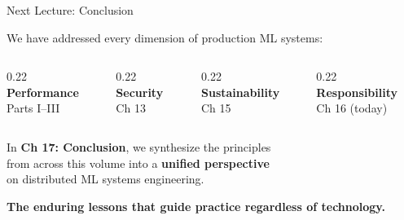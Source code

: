 \documentclass[aspectratio=169, 12pt]{beamer}
\begin{document}
\begin{frame}{Next Lecture: Conclusion}

\centering
\vspace{0.5cm}

{\large We have addressed every dimension of production ML systems:}

\vspace{0.4cm}
\begin{columns}[c]
  \begin{column}{0.22\textwidth}\centering\small
    \textcolor{computestroke}{\textbf{Performance}}\\[0.1cm]
    {\footnotesize Parts I--III}
  \end{column}
  \begin{column}{0.22\textwidth}\centering\small
    \textcolor{routingstroke}{\textbf{Security}}\\[0.1cm]
    {\footnotesize Ch 13}
  \end{column}
  \begin{column}{0.22\textwidth}\centering\small
    \textcolor{datastroke}{\textbf{Sustainability}}\\[0.1cm]
    {\footnotesize Ch 15}
  \end{column}
  \begin{column}{0.22\textwidth}\centering\small
    \textcolor{errorstroke}{\textbf{Responsibility}}\\[0.1cm]
    {\footnotesize Ch 16 (today)}
  \end{column}
\end{columns}

\vspace{0.5cm}
{\normalsize In \textbf{Ch 17: Conclusion}, we synthesize the principles\\
from across this volume into a \textbf{unified perspective}\\
on distributed ML systems engineering.}

\vspace{0.3cm}
{\small\textbf{The enduring lessons that guide practice regardless of technology.}}

\end{frame}
\end{document}
